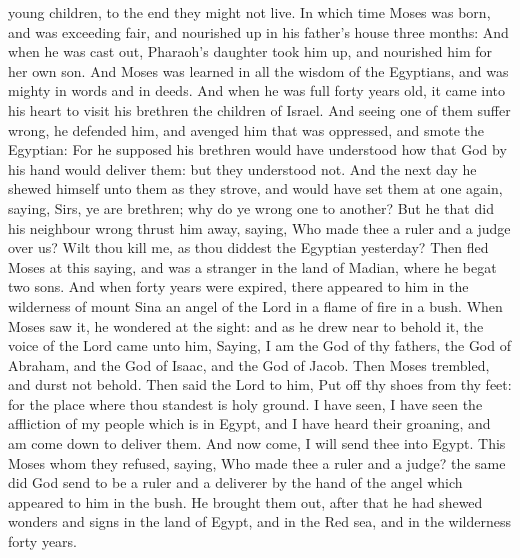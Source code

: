 young children, to the end they might not live.  In which
time Moses was born, and was exceeding fair, and nourished up in his
father's house three months:  And when he was cast out,
Pharaoh's daughter took him up, and nourished him for her own son.
 And Moses was learned in all the wisdom of the
Egyptians, and was mighty in words and in deeds.  And
when he was full forty years old, it came into his heart to visit his
brethren the children of Israel.  And seeing one of them
suffer wrong, he defended him, and avenged him that was oppressed, and
smote the Egyptian:  For he supposed his brethren would
have understood how that God by his hand would deliver them: but they
understood not.  And the next day he shewed himself unto
them as they strove, and would have set them at one again, saying, Sirs,
ye are brethren; why do ye wrong one to another?  But he
that did his neighbour wrong thrust him away, saying, Who made thee a
ruler and a judge over us?  Wilt thou kill me, as thou
diddest the Egyptian yesterday?  Then fled Moses at this
saying, and was a stranger in the land of Madian, where he begat two
sons.  And when forty years were expired, there appeared
to him in the wilderness of mount Sina an angel of the Lord in a flame
of fire in a bush.  When Moses saw it, he wondered at the
sight: and as he drew near to behold it, the voice of the Lord came unto
him,  Saying, I am the God of thy fathers, the God of
Abraham, and the God of Isaac, and the God of Jacob. Then Moses
trembled, and durst not behold.  Then said the Lord to
him, Put off thy shoes from thy feet: for the place where thou standest
is holy ground.  I have seen, I have seen the affliction
of my people which is in Egypt, and I have heard their groaning, and am
come down to deliver them. And now come, I will send thee into Egypt.
 This Moses whom they refused, saying, Who made thee a
ruler and a judge? the same did God send to be a ruler and a deliverer
by the hand of the angel which appeared to him in the bush.
 He brought them out, after that he had shewed wonders
and signs in the land of Egypt, and in the Red sea, and in the
wilderness forty years.

